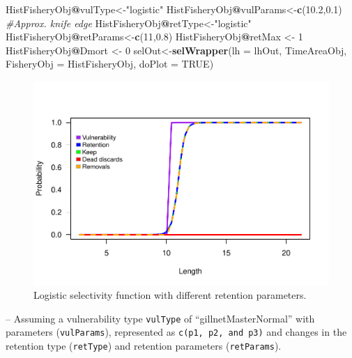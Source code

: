 \documentclass[
]{book}
\newenvironment{Shaded}{\begin{snugshade}}{\end{snugshade}}
\newcommand{\AttributeTok}[1]{\textcolor[rgb]{0.13,0.29,0.53}{#1}}
\newcommand{\CommentTok}[1]{\textcolor[rgb]{0.56,0.35,0.01}{\textit{#1}}}
\newcommand{\ConstantTok}[1]{\textcolor[rgb]{0.56,0.35,0.01}{#1}}
\newcommand{\DecValTok}[1]{\textcolor[rgb]{0.00,0.00,0.81}{#1}}
\newcommand{\FloatTok}[1]{\textcolor[rgb]{0.00,0.00,0.81}{#1}}
\newcommand{\FunctionTok}[1]{\textcolor[rgb]{0.13,0.29,0.53}{\textbf{#1}}}
\newcommand{\NormalTok}[1]{#1}
\newcommand{\OtherTok}[1]{\textcolor[rgb]{0.56,0.35,0.01}{#1}}
\newcommand{\SpecialCharTok}[1]{\textcolor[rgb]{0.81,0.36,0.00}{\textbf{#1}}}
\newcommand{\StringTok}[1]{\textcolor[rgb]{0.31,0.60,0.02}{#1}}
\begin{document}
\begin{Shaded}
\begin{Highlighting}[]
\NormalTok{HistFisheryObj}\SpecialCharTok{@}\NormalTok{vulType}\OtherTok{\textless{}{-}}\StringTok{"logistic"}
\NormalTok{HistFisheryObj}\SpecialCharTok{@}\NormalTok{vulParams}\OtherTok{\textless{}{-}}\FunctionTok{c}\NormalTok{(}\FloatTok{10.2}\NormalTok{,}\FloatTok{0.1}\NormalTok{) }\CommentTok{\#Approx. knife edge}
\NormalTok{HistFisheryObj}\SpecialCharTok{@}\NormalTok{retType}\OtherTok{\textless{}{-}}\StringTok{"logistic"}
\NormalTok{HistFisheryObj}\SpecialCharTok{@}\NormalTok{retParams}\OtherTok{\textless{}{-}}\FunctionTok{c}\NormalTok{(}\DecValTok{11}\NormalTok{,}\FloatTok{0.8}\NormalTok{)}
\NormalTok{HistFisheryObj}\SpecialCharTok{@}\NormalTok{retMax }\OtherTok{\textless{}{-}} \DecValTok{1}
\NormalTok{HistFisheryObj}\SpecialCharTok{@}\NormalTok{Dmort }\OtherTok{\textless{}{-}} \DecValTok{0}
\NormalTok{selOut}\OtherTok{\textless{}{-}}\FunctionTok{selWrapper}\NormalTok{(}\AttributeTok{lh =}\NormalTok{ lhOut, TimeAreaObj, }\AttributeTok{FisheryObj =}\NormalTok{ HistFisheryObj, }\AttributeTok{doPlot =} \ConstantTok{TRUE}\NormalTok{)}
\end{Highlighting}
\end{Shaded}

\begin{figure}
\centering
\includegraphics{_main_files/figure-latex/sel3-1.pdf}
\caption{\label{fig:sel3}Logistic selectivity function with different retention parameters.}
\end{figure}

-- Assuming a vulnerability type \texttt{vulType} of ``gillnetMasterNormal'' with parameters (\texttt{vulParams}), represented as \texttt{c(p1,\ p2,\ and\ p3)} and changes in the retention type (\texttt{retType}) and retention parameters (\texttt{retParams}).
\end{document}
